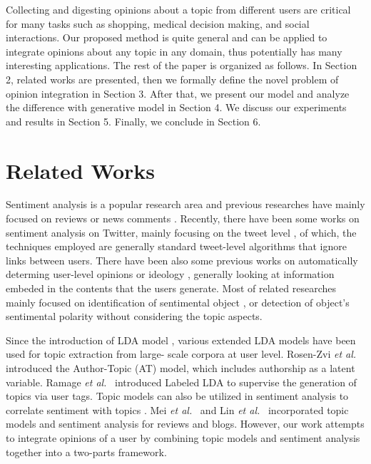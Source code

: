 \documentclass[runningheads,a4paper]{llncs}
\begin{document}
Collecting and digesting opinions about a topic from different users are critical for many tasks such as shopping, medical decision making, and social interactions. Our proposed method is quite general and can be applied to integrate opinions about any topic in any domain, thus potentially has many interesting applications. The rest of the paper is organized as follows. In Section 2, related works are presented, then we formally define the novel problem of opinion integration in Section 3. After that, we present our model and analyze the difference with generative model in Section 4. We discuss our experiments and results in Section 5. Finally, we conclude in Section 6.

\section{Related Works}
\label{sec2}

Sentiment analysis is a popular research area and previous researches have mainly focused on reviews or news comments \cite{pang2008opinion,liu2012sentiment}. 
Recently, there have been some works on sentiment analysis on Twitter, mainly focusing on the tweet level \cite{barbosa2010robust,davidov2010enhanced,jiang2011target,li2010micro,tan2011user}, of which, the techniques employed are generally standard tweet-level algorithms that ignore links between users. There have been also some previous works on automatically determing user-level opinions or ideology \cite{agrawal2003mining,mostafa2013more,malouf2008taking,yu2008classifying}, generally looking at information embeded in the contents that the users generate. Most of related researches mainly focused on identification of sentimental object \cite{liu2010comment}, or detection of object’s sentimental polarity \cite{zhai2011constrained} without considering the topic aspects. 

Since the introduction of LDA model \cite{blei2003latent}, various extended LDA models have been used for topic extraction from large- scale corpora at user level. Rosen-Zvi \emph{et al.}~\cite{rosen2004author} introduced the Author-Topic (AT) model, which includes authorship as a latent variable. Ramage \emph{et al.}~\cite{ramage2009labeled} introduced Labeled LDA to supervise the generation of topics via user tags. Topic models can also be utilized in sentiment analysis to correlate sentiment with topics \cite{mei2007topic,lin2009joint}. Mei \emph{et al.}~\cite{mei2007topic} and Lin \emph{et al.}~\cite{lin2009joint} incorporated topic models and sentiment analysis for reviews and blogs. However, our work attempts to integrate opinions of a user by combining topic models and sentiment analysis together into a two-parts framework.
\end{document}
